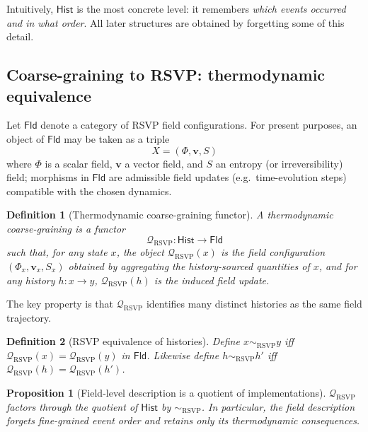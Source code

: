 \documentclass[11pt]{article}
\newtheorem{definition}{Definition}
\newtheorem{proposition}{Proposition}
\begin{document}
Intuitively, $\mathsf{Hist}$ is the most concrete level: it remembers \emph{which
events occurred and in what order}. All later structures are obtained by
forgetting some of this detail.

\subsection{Coarse-graining to RSVP: thermodynamic equivalence}

Let $\mathsf{Fld}$ denote a category of RSVP field configurations. For present
purposes, an object of $\mathsf{Fld}$ may be taken as a triple
\[
X = (\Phi,\mathbf{v},S)
\]
where $\Phi$ is a scalar field, $\mathbf{v}$ a vector field, and $S$ an entropy
(or irreversibility) field; morphisms in $\mathsf{Fld}$ are admissible field
updates (e.g.\ time-evolution steps) compatible with the chosen dynamics.

\begin{definition}[Thermodynamic coarse-graining functor]
A \emph{thermodynamic coarse-graining} is a functor
\[
\mathcal{Q}_{\mathrm{RSVP}} : \mathsf{Hist} \to \mathsf{Fld}
\]
such that, for any state $x$, the object $\mathcal{Q}_{\mathrm{RSVP}}(x)$ is the
field configuration $(\Phi_x,\mathbf{v}_x,S_x)$ obtained by aggregating the
history-sourced quantities of $x$, and for any history $h:x\to y$,
$\mathcal{Q}_{\mathrm{RSVP}}(h)$ is the induced field update.
\end{definition}

The key property is that $\mathcal{Q}_{\mathrm{RSVP}}$ identifies many distinct
histories as the same field trajectory.

\begin{definition}[RSVP equivalence of histories]
Define $x \sim_{\mathrm{RSVP}} y$ iff
$\mathcal{Q}_{\mathrm{RSVP}}(x) = \mathcal{Q}_{\mathrm{RSVP}}(y)$ in $\mathsf{Fld}$.
Likewise define $h \sim_{\mathrm{RSVP}} h'$ iff
$\mathcal{Q}_{\mathrm{RSVP}}(h) = \mathcal{Q}_{\mathrm{RSVP}}(h')$.
\end{definition}

\begin{proposition}[Field-level description is a quotient of implementations]
$\mathcal{Q}_{\mathrm{RSVP}}$ factors through the quotient of $\mathsf{Hist}$ by
$\sim_{\mathrm{RSVP}}$. In particular, the field description forgets fine-grained
event order and retains only its thermodynamic consequences.
\end{proposition}
\end{document}
